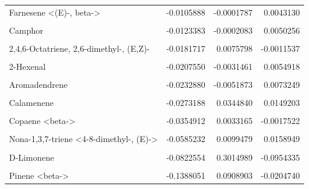 \documentclass[12pt,final,CPage]{ufthesis}
\begin{document}
{\begin{longtable}[t]{lrrr}
  Farnesene <(E)-, beta-> & -0.0105888 & -0.0001787 & 0.0043130\\
  \cellcolor{gray!6}{Nerolidol} & \cellcolor{gray!6}{-0.0108202} & \cellcolor{gray!6}{-0.0010233} & \cellcolor{gray!6}{0.0035165}\\
  Camphor & -0.0123383 & -0.0002083 & 0.0050256\\
  \addlinespace
  \cellcolor{gray!6}{unknown} & \cellcolor{gray!6}{-0.0181488} & \cellcolor{gray!6}{-0.0003063} & \cellcolor{gray!6}{0.0073923}\\
  2,4,6-Octatriene, 2,6-dimethyl-, (E,Z)- & -0.0181717 & 0.0075798 & -0.0011537\\
  \cellcolor{gray!6}{Caryophyllene <9-epi-(E)->} & \cellcolor{gray!6}{-0.0205377} & \cellcolor{gray!6}{0.0115902} & \cellcolor{gray!6}{-0.0028174}\\
  2-Hexenal & -0.0207550 & -0.0031461 & 0.0054918\\
  \cellcolor{gray!6}{Ocimene, <trans-beta->} & \cellcolor{gray!6}{-0.0210164} & \cellcolor{gray!6}{0.0047960} & \cellcolor{gray!6}{0.0027111}\\
  \addlinespace
  Aromadendrene & -0.0232880 & -0.0051873 & 0.0073249\\
  \cellcolor{gray!6}{Humulene} & \cellcolor{gray!6}{-0.0252997} & \cellcolor{gray!6}{0.0082004} & \cellcolor{gray!6}{-0.0020543}\\
  Calamenene & -0.0273188 & 0.0344840 & 0.0149203\\
  \cellcolor{gray!6}{Cadinene <delta->} & \cellcolor{gray!6}{-0.0319648} & \cellcolor{gray!6}{-0.0075670} & \cellcolor{gray!6}{0.0026733}\\
  Copaene <beta-> & -0.0354912 & 0.0033165 & -0.0017522\\
  \addlinespace
  \cellcolor{gray!6}{3-Hexen-1-ol, (Z)-} & \cellcolor{gray!6}{-0.0571536} & \cellcolor{gray!6}{-0.0073374} & \cellcolor{gray!6}{0.0329533}\\
  Nona-1,3,7-triene <4-8-dimethyl-, (E)-> & -0.0585232 & 0.0099479 & 0.0158949\\
  \cellcolor{gray!6}{Germacrene D} & \cellcolor{gray!6}{-0.0740663} & \cellcolor{gray!6}{0.0102778} & \cellcolor{gray!6}{-0.0027056}\\
  D-Limonene & -0.0822554 & 0.3014989 & -0.0954335\\
  \cellcolor{gray!6}{Methyl Salicylate} & \cellcolor{gray!6}{-0.1230488} & \cellcolor{gray!6}{0.0195828} & \cellcolor{gray!6}{0.2451660}\\
  \addlinespace
  Pinene <beta-> & -0.1388051 & 0.0908903 & -0.0204740\\

\end{longtable}}
\end{document}
